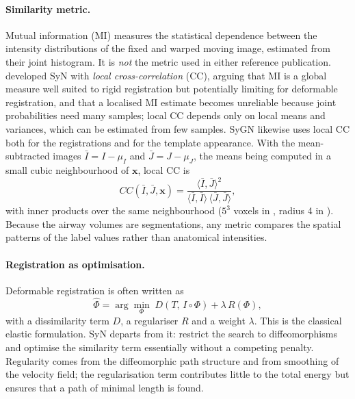 \paragraph{Similarity metric.}  %
Mutual information (MI) measures the statistical dependence between the
intensity distributions of the fixed and warped moving image, estimated from
their joint histogram. It is \emph{not} the metric used in either reference
publication. \citet{avants2008syn} developed SyN with \emph{local
cross-correlation} (CC), arguing that MI is a global measure well suited to
rigid registration but potentially limiting for deformable registration, and
that a localised MI estimate becomes unreliable because joint probabilities need
many samples; local CC depends only on local means and variances, which can be
estimated from few samples. SyGN \cite{avants2010sygn} likewise uses local CC
both for the registrations and for the template appearance. With the
mean-subtracted images $\bar I = I-\mu_I$ and $\bar J = J-\mu_J$, the means being
computed in a small cubic neighbourhood of $\mathbf{x}$, local CC is
\begin{equation}
  CC(\bar I,\bar J,\mathbf{x})
  = \frac{\langle \bar I,\bar J\rangle^2}
         {\langle \bar I,\bar I\rangle\,\langle \bar J,\bar J\rangle},
  \label{eq:local_cc}            %
\end{equation}
with inner products over the same neighbourhood ($5^3$ voxels in
\citet{avants2008syn}, radius 4 in \citet{avants2010sygn}). Because the airway
volumes are segmentations, any metric compares the spatial patterns of the
label values rather than anatomical intensities.

\paragraph{Registration as optimisation.}  %
Deformable registration is often written as
\begin{equation}
  \hat{\Phi} = \arg\min_{\Phi}\;
  D\!\left(T,\, I\circ\Phi\right) + \lambda\, R(\Phi),
  \label{eq:registration_objective}  %
\end{equation}
with a dissimilarity term $D$, a regulariser $R$ and a weight $\lambda$. This is
the classical elastic formulation. SyN departs from it: \citet{avants2008syn}
restrict the search to diffeomorphisms and optimise the similarity term
essentially without a competing penalty. Regularity comes from the diffeomorphic
path structure and from smoothing of the velocity field; the regularisation term
contributes little to the total energy but ensures that a path of minimal length
is found.


